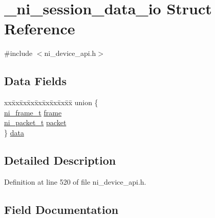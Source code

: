 \hypertarget{struct__ni__session__data__io}{}\section{\+\_\+ni\+\_\+session\+\_\+data\+\_\+io Struct Reference}
\label{struct__ni__session__data__io}


{\ttfamily \#include $<$ni\+\_\+device\+\_\+api.\+h$>$}

\subsection*{Data Fields}
\begin{DoxyCompactItemize}
\item 
\begin{tabbing}
xx\=xx\=xx\=xx\=xx\=xx\=xx\=xx\=xx\=\kill
union \{\\
\>\mbox{\hyperlink{ni__device__api_8h_a3105b2de7051b2d7e2676b132b1d8b95}{ni\_frame\_t}} \mbox{\hyperlink{struct__ni__session__data__io_aea2177bca942215ff8bda12a813375f3}{frame}}\\
\>\mbox{\hyperlink{ni__device__api_8h_aa2b6b671c9baca6fd1eb993a13c04188}{ni\_packet\_t}} \mbox{\hyperlink{struct__ni__session__data__io_a5f6a5891ce9ba762cfb6cd08965e3acb}{packet}}\\
\} \mbox{\hyperlink{struct__ni__session__data__io_a4beac3c768ff45933065de79f174b42b}{data}}\\

\end{tabbing}\end{DoxyCompactItemize}


\subsection{Detailed Description}


Definition at line 520 of file ni\+\_\+device\+\_\+api.\+h.



\subsection{Field Documentation}
\mbox{\label{struct__ni__session__data__io_a4beac3c768ff45933065de79f174b42b}} 

